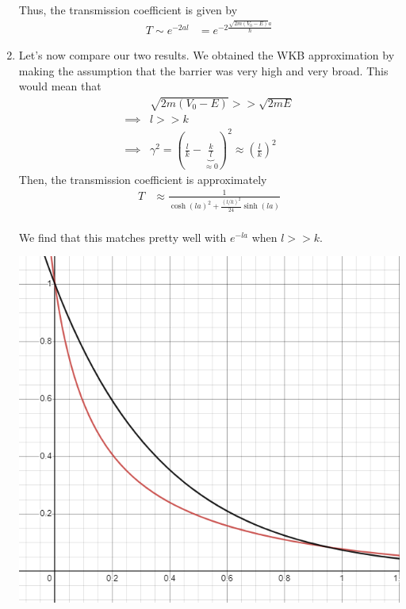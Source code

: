 \documentclass{article}
\begin{document}
\begin{enumerate}[label=(\alph*)]
  Thus, the transmission coefficient is given by 
  \begin{align*}
    T \sim e^{-2al} &= e^{-2\frac{\sqrt{2m(V_0 - E)}a}{\hbar}}
  \end{align*}

  \vskip 0.5cm
  \item Let's now compare our two results. We obtained the WKB approximation by making the assumption that the barrier was very high and very broad. This would mean that 
  \begin{align*}
    &\sqrt{2m(V_0 - E)} >> \sqrt{2mE} \\
    \implies&l >> k \\
    \implies& \gamma^2 = \left(\frac{l}{k} - \underbrace{\frac{k}{l}}_{\approx 0}\right)^2 \approx \left(\frac{l}{k}\right)^2
  \end{align*}
  Then, the transmission coefficient is approximately 
  \begin{align*}
    T &\approx \frac{1}{\cosh(la)^2 + \frac{(l/k)^2}{24}\sinh(la)} \\
  \end{align*}

  We find that this matches pretty well with $e^{-la}$ when $l >> k$.
  \begin{center}
    \includegraphics*[scale=.40]{Q2(c).png}
  \end{center}
  
\end{enumerate}
\end{document}
